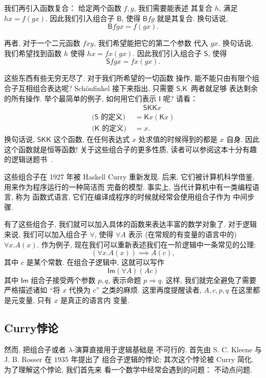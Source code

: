 \documentclass[UTF8]{ctexbook}
\newcommand{\cons}[1]{\textsf{#1}}
\theoremstyle{plain}
\theoremstyle{definition}
\theoremstyle{remark}
\begin{document}
我们再引入函数复合： 给定两个函数 \(f, g\), 我们需要能表述
其复合 \(h\), 满足 \(hx = f(gx)\). 因此我们引入组合子 \(\cons{B}\),
使得 \(\cons{B}fg\) 就是其复合. 换句话说,
\[\cons{B}fgx = f(gx).\]

再者, 对于一个二元函数 \(fxy\), 我们希望能把它的第二个参数
代入 \(gx\). 换句话说, 我们希望找到函数 \(h\)
使得 \(hx = fx(gx)\). 因此我们引入组合子 \(\cons{S}\),
使得 \[\cons{S}fgx = fx(gx).\]

这些东西有些无穷无尽了. 对于我们所希望的一切函数
操作, 能不能只由有限个组合子互相组合表达呢? Sch\"onfinkel
接下来指出, 只需要 \(\cons{S}, \cons{K}\) 两者就足够
表达剩余的所有操作. 举个最简单的例子, 如何用它们表示 \(\cons{I}\)
呢? 请看：
\[\begin{aligned}
  &\quad~\cons{S}\cons{K}\cons{K}x\\
\text{(\(\cons{S}\) 的定义) }&= \cons{K}x(\cons{K}x)\\
\text{(\(\cons{K}\) 的定义) }&= x.
\end{aligned}\]
换句话说, \(\cons{S}\cons{K}\cons{K}\) 这个函数,
在任何表达式 \(x\) 处求值的时候得到的都是 \(x\) 自身.
因此这个函数就是恒等函数! 关于这些组合子的更多性质,
读者可以参阅这本十分有趣的逻辑谜题书~\cite{schonfinkel:1924:combinator}.

这些组合子在 1927 年被 Haskell Curry 重新发现.
后来, 它们被计算机科学借鉴, 用来作为程序运行的一种简洁而
完备的模型. 事实上, 当代计算机中有一类编程语言, 称为
函数式语言, 它们在编译成程序的时候就经常会使用组合子作为
中间步骤.

有了这些组合子, 我们就可以加入具体的函数来表达丰富的数学对象了.
对于逻辑来说, 我们可以加入组合子 \(\forall\), 使得
\(\forall A\) 表示 (在常规的有变量的语言中的) \(\forall x. A(x)\).
作为例子, 现在我们可以重新表述我们在一阶逻辑中一条常见的公理:
\[(\forall x. A(x)) \implies A(c),\]
其中 \(c\) 是某个常数. 在组合子逻辑中, 这就可以写作
\[\cons{Im}(\forall A)(A c)\]
其中 \(\cons{Im}\) 组合子接受两个参数 \(p, q\), 表示命题
\(p \Rightarrow q\). 这样, 我们就完全避免了需要严格描述诸如
“将 \(x\) 代换为 \(c\)” 之类的麻烦. 这里再度提醒读者,
\(A, c, p, q\) 在这里都是元变量, 只有 \(x\) 是真正的语言内
变量.

\subsection{Curry悖论}
然而, 把组合子或者 \(\lambda\)-演算直接用于逻辑基础是
不可行的. 首先由 S. C. Kleene 与 J. B. Rosser 在 1935 年提出了
组合子逻辑的悖论; 其次这个悖论被 Curry 简化. 为了理解这个悖论, 我们首先来
看一个数学中经常会遇到的问题： 不动点问题.
\end{document}
